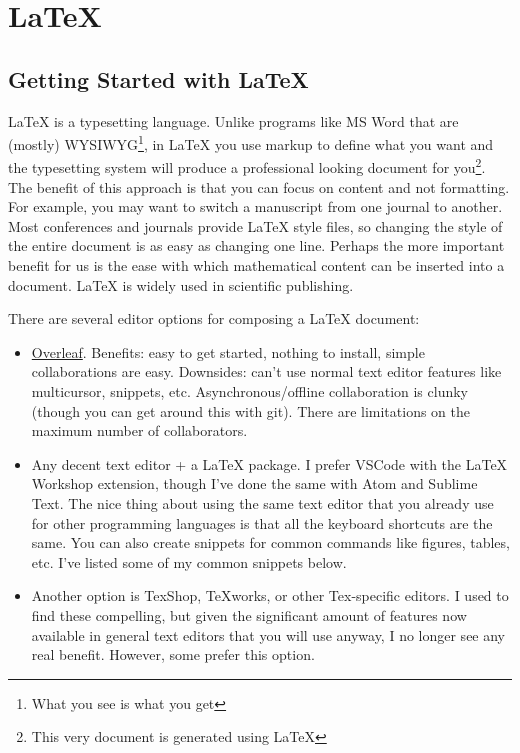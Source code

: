 
\chapter{\LaTeX{}}
\label{ch:latex}

\section{Getting Started with \LaTeX{}}

\LaTeX{} is a typesetting language.  Unlike programs like MS Word that are (mostly) WYSIWYG\footnote{What you see is what you get}, in \LaTeX{} you use markup to define what you want and the typesetting system will produce a professional looking document for you\footnote{This very document is generated using \LaTeX{}}.  The benefit of this approach is that you can focus on content and not formatting.  For example, you may want to switch a manuscript from one journal to another.  Most conferences and journals provide \LaTeX{} style files, so changing the style of the entire document is as easy as changing one line.  Perhaps the more important benefit for us is the ease with which mathematical content can be inserted into a document.  \LaTeX{} is widely used in scientific publishing.

There are several editor options for composing a LaTeX document:
\begin{itemize}
    \item \href{https://www.overleaf.com}{Overleaf}.  Benefits: easy to get started, nothing to install, simple collaborations are easy. Downsides: can't use normal text editor features like multicursor, snippets, etc.  Asynchronous/offline collaboration is clunky (though you can get around this with git).  There are limitations on the maximum number of collaborators.
    \item Any decent text editor + a LaTeX package.  I prefer VSCode with the LaTeX Workshop extension, though I've done the same with Atom and Sublime Text.  The nice thing about using the same text editor that you already use for other programming languages is that all the keyboard shortcuts are the same.  You can also create snippets for common commands like figures, tables, etc.  I've listed some of my common snippets below.
    \item Another option is TexShop, TeXworks, or other Tex-specific editors.  I used to find these compelling, but given the significant amount of features now available in general text editors that you will use anyway, I no longer see any real benefit.  However, some prefer this option.
\end{itemize}

